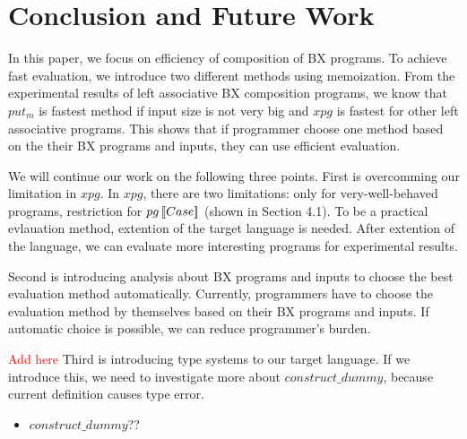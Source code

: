 \section{Conclusion and Future Work}

In this paper, we focus on efficiency of composition of BX programs.
To achieve fast evaluation, we introduce two different methods using memoization.
From the experimental results of left associative BX composition programs, we know that $put_m$ is fastest method if input size is not very big and $xpg$ is fastest for other left associative programs.
This shows that if programmer choose one method based on the their BX programs and inputs, they can use efficient evaluation. 


We will continue our work on the following three points.
First is overcomming our limitation in $xpg$. In $xpg$, there are two limitations: only for very-well-behaved programs, restriction for $pg \, [\![Case]\!]$ (shown in Section 4.1). To be a practical evlauation method, extention of the target language is needed. After extention of the language, we can evaluate more interesting programs for experimental results.

Second is introducing analysis about BX programs and inputs to choose the best evaluation method automatically.
Currently, programmers have to choose the evaluation method by themselves based on their BX programs and inputs. If automatic choice is possible, we can reduce programmer's burden.

\textcolor{red}{Add here}
Third is introducing type systems to our target language. If we introduce this, we need to investigate more about $construct\_dummy$, because current definition causes type error.


\begin{itemize}
\item $construct\_dummy$??
\end{itemize}







